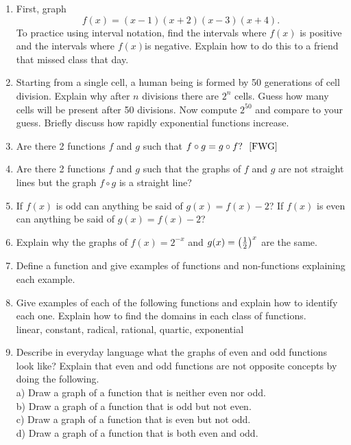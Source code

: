\begin{enumerate}
\item First, graph $$f(x)=(x-1)(x+2)(x-3)(x+4).$$  To practice using interval notation, find the intervals where $f(x)$ is positive and the intervals where $f(x)$is negative.  Explain how to do this to a friend that missed class that day.

\item Starting from a single cell, a human being is formed by 50 generations of cell division.  Explain why after $n$ divisions there are $2^n$ cells.  Guess how many cells will be present after 50 divisions.  Now compute $2^{50}$ and compare to your guess.  Briefly discuss how rapidly exponential functions increase.  \cite{SM}

\item Are there 2 functions $f$ and $g$ such that $f \circ g = g \circ f?\ \ \cite{FWG}$    

\item Are there 2 functions $f $ and $g$ such that the graphs of $f$ and $g$ are not straight lines but the graph $f \circ g$ is a straight line?  \cite{FWG}

\item If $f(x)$ is odd can anything be said of $g(x) = f(x) - 2$? If $f(x)$ is even can anything be said of $g(x) = f(x) - 2$?  \cite{FWG}

\item Explain why the graphs of $f(x) = 2^{ - x}$  and $ g(x) = \left( {{\textstyle{1 \over 2}}} \right)^x $ are the same.  \cite{SM}

\item Define a function and give examples of functions and non-functions explaining each example.

\item Give examples of each of the following functions and explain how to identify each one.  Explain how to find the domains in each class of functions.     \\   linear, constant, radical, rational, quartic, exponential

\item Describe in everyday language what the graphs of even and odd functions look like?  Explain that even and odd functions are not opposite concepts by doing the following.    \\a)  Draw a graph of a function that is neither even nor odd.    \\b)  Draw a graph of a function that is odd but not even.    \\c)  Draw a graph of a function that is even but not odd.    \\d)  Draw a graph of a function that is both even and odd.


\end{enumerate}
